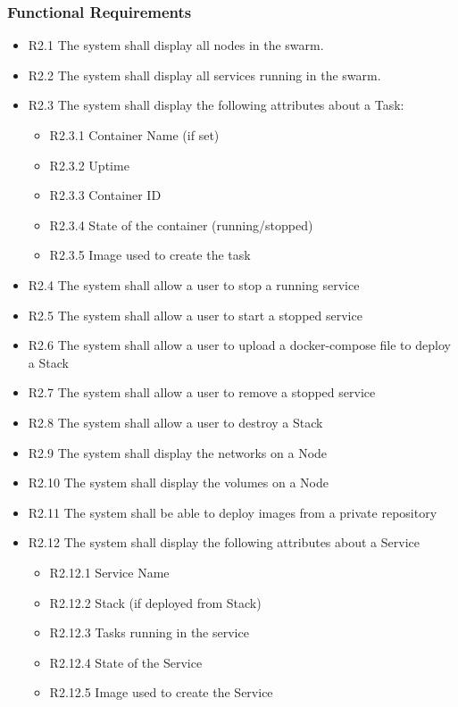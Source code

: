\documentclass[]{article}
\begin{document}
\subsubsection{Functional Requirements}
\begin{itemize}
	\item R2.1 The system shall display all nodes in the swarm.
	\item R2.2 The system shall display all services running in the swarm.
	\item R2.3 The system shall display the following attributes about a Task:
		\begin{itemize}
			\item R2.3.1 Container Name (if set)
			\item R2.3.2 Uptime
			\item R2.3.3 Container ID
			\item R2.3.4 State of the container (running/stopped)
			\item R2.3.5 Image used to create the task
		\end{itemize}
	\item R2.4 The system shall allow a user to stop a running service
	\item R2.5 The system shall allow a user to start a stopped service
	\item R2.6 The system shall allow a user to upload a docker-compose file to deploy a Stack
	\item R2.7 The system shall allow a user to remove a stopped service
	\item R2.8 The system shall allow a user to destroy a Stack
	\item R2.9 The system shall display the networks on a Node
	\item R2.10 The system shall display the volumes on a Node
	\item R2.11 The system shall be able to deploy images from a private repository
	\item R2.12 The system shall display the following attributes about a Service
	\begin{itemize}
		\item R2.12.1 Service Name
		\item R2.12.2 Stack (if deployed from Stack)
		\item R2.12.3 Tasks running in the service
		\item R2.12.4 State of the Service
		\item R2.12.5 Image used to create the Service
	\end{itemize}
\end{itemize}
\end{document}
